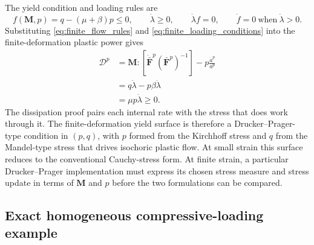 \documentclass[11pt]{article}
\newcommand{\mbf}[1]{\mathbf{#1}}
\begin{document}
The yield condition and loading rules are
\begin{equation}
	f(\mbf M,p)=q-(\mu+\beta)p\le0,
	\qquad
	\dot\lambda\ge0,
	\qquad
	\dot\lambda f=0,
	\qquad
	\dot f=0\ \text{when}\ \dot\lambda>0.
	\label{eq:finite_loading_conditions}
\end{equation}
Substituting \eqref{eq:finite_flow_rules} and
\eqref{eq:finite_loading_conditions} into the finite-deformation plastic power
gives
\begin{align*}
	\mathcal D^p
	 & =\mbf M:
	\left[
		\dot{\bar{\mbf F}}^{p}(\bar{\mbf F}^{p})^{-1}
		\right]
	-p\frac{\dot a^p}{a^p}
	\\
	 & =q\dot\lambda-p\beta\dot\lambda
	\\
	 & =\mu p\dot\lambda
	\ge0.
\end{align*}
The dissipation proof pairs each internal rate with the stress that does work
through it.  The finite-deformation yield surface is therefore a
Drucker--Prager-type condition in \((p,q)\), with \(p\) formed from the
Kirchhoff stress and \(q\) from the Mandel-type stress that drives isochoric
plastic flow.  At small strain this surface reduces to the conventional
Cauchy-stress form.  At finite strain, a particular Drucker--Prager
implementation must express its chosen stress measure and stress update in
terms of \(\mbf M\) and \(p\) before the two formulations can be compared.

\subsection{Exact homogeneous compressive-loading example}
\label{sec:finite_example}
\end{document}
